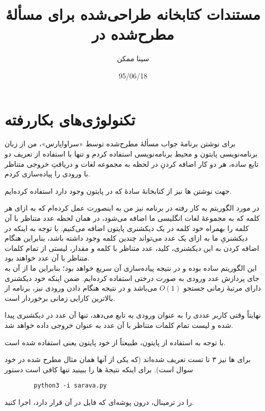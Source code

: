 \documentclass[a4paper]{article}
\title{مستندات کتابخانه طراحی‌شده برای مسألهٔ مطرح‌شده در \lr{zconf}}
\author{سینا ممکن}
\date{95/06/18}
\theoremstyle{plain}
\begin{document}
\maketitle

\section*{تکنولوژی‌های بکاررفته}
برای نوشتن برنامهٔ جواب مسألهٔ مطرح‌شده توسط «سراواپارس»، من از زبان برنامه‌نویسی پایتون و محیط برنامه‌نویسی  استفاده کردم و تنها با استفاده از تعریف دو تابع ساده، هر دو کار اضافه کردنِ در لحظه به مجموعه لغات و دریافتِ خروجی متناظر با ورودی را پیاده‌سازی کردم.

جهت نوشتن ها نیز از کتابخانهٔ ساده‌ٔ  که در پایتون وجود دارد استفاده کرده‌ایم.

در مورد الگوریتم به کار رفته در برنامه نیز من به اینصورت عمل کرده‌ام که به ازای هر کلمه که به مجموعهٔ لغات انگلیسی ما اضافه می‌شود، در همان لحظه عدد متناظر با آن کلمه را بهمراه خود کلمه در یک دیکشنری پایتون اضافه می‌کنیم. با توجه به اینکه در دیکشنریِ ما به ازای یک عدد می‌تواند چندین کلمه وجود داشته باشد، بنابراین هنگام اضافه کردن به این دیکشنری، کلید، عدد متناظر با کلمه و مقدار، لیستی از تمام کلمات متناظر با آن عدد خواهند بود.
\\
این الگوریتم ساده بوده و در نتیجه پیاده‌سازی آن سریع خواهد بود؛ بنابراین ما از آن به جای پردازش عدد ورودی به صورت درختی استفاده کرده‌ایم. ضمن اینکه خود دیکشنری دارای مرتبهٔ زمانی جستجو $O(1)$ می‌باشد و در نتیجه هنگام دادن ورودی نیز، برنامه از بالاترین کارایی زمانی برخوردار است.

نهایتاً وقتی کاربر عددی را به عنوان ورودی به تابع  می‌دهد، تنها آن عدد در دیکشنری پیدا شده و لیست تمام کلمات متناظر با آن عدد به عنوان خروجی داده خواهد شد.

با توجه به استفاده از پایتون، طبیعتاً از  خود پایتون یعنی  استفاده شده است.

برای ها نیز ۳ تا تست تعریف شده‌اند (که یکی از آنها همان مثال مطرح شده در خود سوال است). برای اینکه نتیجهٔ ها را ببینید تنها کافی است دستور
\begin{latin}
	\begin{verbatim}
		python3 -i sarava.py
	\end{verbatim}
\end{latin}
را در ترمینال، درون پوشه‌ای که فایل  در آن قرار دارد، اجرا کنید.
\end{document}
